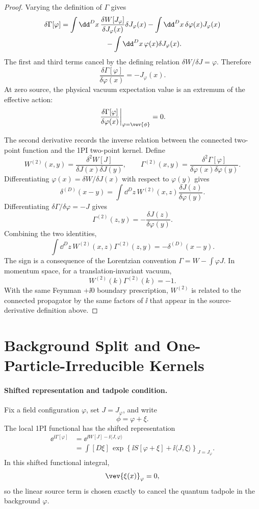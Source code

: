 \begin{proof}
Varying the definition of \(\Gamma\) gives
\[
\begin{aligned}
  \delta\Gamma[\varphi]
  &=
  \int \dd^Dx\,
  \frac{\delta W[J_{\varphi}]}{\delta J_{\varphi}(x)}
  \delta J_{\varphi}(x)
  -
  \int \dd^Dx\,
  \delta\varphi(x)J_{\varphi}(x)        \\
  &\hspace{2.2cm}
  -
  \int \dd^Dx\,
  \varphi(x)\delta J_{\varphi}(x).
\end{aligned}
\]
The first and third terms cancel by the defining relation
\(\delta W/\delta J=\varphi\).  Therefore
\[
  \frac{\delta\Gamma[\varphi]}{\delta\varphi(x)}
  =
  -J_{\varphi}(x).
\]
At zero source, the physical vacuum expectation value is an extremum of the
effective action:
\[
  \left.
  \frac{\delta\Gamma[\varphi]}{\delta\varphi(x)}
  \right|_{\varphi=\vev{\phi}}
  =0 .
\]

The second derivative records the inverse relation between the connected
two-point function and the 1PI two-point kernel.  Define
\[
  W^{(2)}(x,y)
  =
  \frac{\delta^2 W[J]}{\delta J(x)\delta J(y)},
  \qquad
  \Gamma^{(2)}(x,y)
  =
  \frac{\delta^2\Gamma[\varphi]}{\delta\varphi(x)\delta\varphi(y)} .
\]
Differentiating \(\varphi(x)=\delta W/\delta J(x)\) with respect to
\(\varphi(y)\) gives
\[
  \delta^{(D)}(x-y)
  =
  \int \dd^Dz\,W^{(2)}(x,z)
  \frac{\delta J(z)}{\delta\varphi(y)} .
\]
Differentiating \(\delta\Gamma/\delta\varphi=-J\) gives
\[
  \Gamma^{(2)}(z,y)
  =
  -\frac{\delta J(z)}{\delta\varphi(y)} .
\]
Combining the two identities,
\[
  \int \dd^Dz\,
  W^{(2)}(x,z)\Gamma^{(2)}(z,y)
  =
  -\delta^{(D)}(x-y).
\]
The sign is a consequence of the Lorentzian convention
\(\Gamma=W-\int\varphi J\).  In momentum space, for a translation-invariant
vacuum,
\[
  W^{(2)}(k)\Gamma^{(2)}(k)=-1 .
\]
With the same Feynman \(+\ii0\) boundary prescription, \(W^{(2)}\) is related
to the connected propagator by the same factors of \(\ii\) that appear in the
source-derivative definition above.
\end{proof}

\section{Background Split and One-Particle-Irreducible Kernels}

\paragraph{Shifted representation and tadpole condition.}
Fix a field configuration \(\varphi\), set \(J=J_{\varphi}\), and write
\[
  \phi=\varphi+\xi .
\]
The local 1PI functional has the shifted representation
\[
\begin{aligned}
  \ee^{\ii\Gamma[\varphi]}
  &=
  \ee^{\ii W[J]-\ii\langle J,\varphi\rangle}  \\
  &=
  \int [D\xi]\,
  \exp\!\left\{
    \ii S[\varphi+\xi]
    +
    \ii\langle J,\xi\rangle
  \right\}_{J=J_{\varphi}} .
\end{aligned}
\]
In this shifted functional integral,
\[
  \vev{\xi(x)}_{\varphi}=0 ,
\]
so the linear source term is chosen exactly to cancel the quantum tadpole in
the background \(\varphi\).

